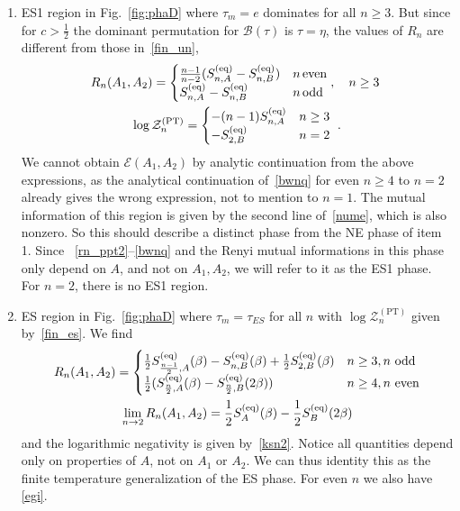\documentclass[a4paper,11pt]{article}
\newcommand\half{{\ensuremath{\frac{1}{2}}}}
\newcommand{\Zpt}{\sZ_n^{(\text{PT})}}
\newcommand{\bega}{\begin{gather}}
\newcommand{\bca}{\begin{cases}}
\newcommand{\eca}{\end{cases}}
\def\b{{\beta}}
\newcommand\ov{\over}
\newcommand\ha{{\half}}
\newcommand\sB{{\ensuremath{{\mathcal B}}}}
\newcommand\sE{{\ensuremath{{\mathcal E}}}}
\newcommand\sZ{{\mathcal Z}}
\begin{document}
\begin{enumerate}
\begin{enumerate}
\item ES1 region in Fig.~\ref{fig:phaD} where $\tau_m = e$ dominates for all $n\geq 3$. But since for $c>\ha$ the dominant permutation for $\sB(\tau)$ is $\tau=\eta$, the values of $R_n$ are different from those in~\eqref{fin_un}, 
\bega 
R_n(A_1, A_2) = \bca {n-1 \ov n-2} (S_{n,A}^{(\rm eq)} - S^{\rm (eq)}_{n, B}) & n \, {\rm even} \cr
S_{n,A}^{(\rm eq)} - S^{\rm (eq)}_{n, B} & n \, {\rm odd} 
\eca , \quad n\geq 3 \ %
\label{rn_ppt2}
\\
\log \sZ_n^{\rm (PT)} =\begin{cases} - (n-1) S_{n,A}^{(\rm eq)} 
 & n \geq 3 \\ 
- S^{\rm (eq)}_{2,B} & n = 2
\end{cases} \ .
\label{bwnq}
\end{gather} 
We cannot obtain $\sE(A_1, A_2)$ by analytic continuation from the above expressions, as the analytical continuation of~\eqref{bwnq} for even $n\geq 4$ to $n=2$ already gives the wrong expression, not to mention to $n=1$. 
The mutual information of this region is given by the second line of~\eqref{nume}, which is also nonzero. So this should describe a distinct phase from the NE phase of item 1. Since ~\eqref{rn_ppt2}--\eqref{bwnq} and the Renyi mutual informations in this phase only depend on $A$, and not on $A_1, A_2$, we will refer to it as the ES1 phase. 
For $n=2$, there is no ES1 region.

 


\item ES region in Fig.~\ref{fig:phaD} where $\tau_m = \tau_{ES}$ for all $n$ with $\log \Zpt$ given by~\eqref{fin_es}. We find 
\begin{gather} 
R_n(A_1, A_2) = \begin{cases} 
\ha S^{\rm (eq)}_{{n-1 \ov 2}, A}(\beta) - S^{\rm (eq)}_{n, B} (\b) + \ha S^{\rm (eq)}_{2, B} (\b) 
 & n\geq 3, n \text{ odd}\\
\frac{1}{2} (S^{\rm (eq)}_{{n \ov 2}, A}(\beta)- S^{\rm (eq)}_{{n \ov 2}, B}( 2\beta)) & n\geq 4, n \text{ even}
\end{cases} 
\\
\lim_{n\rightarrow 2} R_n(A_1, A_2) = \ha S_A^{(\rm eq)} (\b) -\ha S^{\rm (eq)}_B (2 \b) 
\end{gather} 
and the logarithmic negativity is given by~\eqref{ksn2}. 
Notice all quantities depend only on properties of $A$, not on $A_1$ or $A_2$. 
We can thus identity this as the finite temperature generalization of the ES phase. 
For even $n$ we also have \eqref{egi}. 


\end{enumerate}
\end{enumerate}
\end{document}
